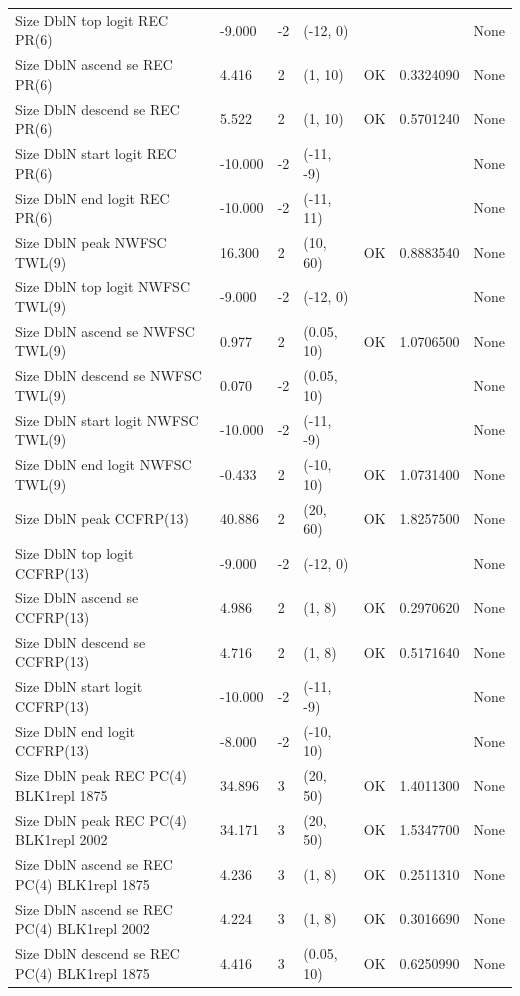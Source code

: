 \documentclass[11pt,
  english,
]{article}
\begin{document}
\begin{landscape}
\begin{longtable}[t]{lllllll}
\addlinespace
Size DblN top logit REC PR(6) & -9.000 & -2 & (-12, 0) &  &  & None\\
Size DblN ascend se REC PR(6) & 4.416 & 2 & (1, 10) & OK & 0.3324090 & None\\
Size DblN descend se REC PR(6) & 5.522 & 2 & (1, 10) & OK & 0.5701240 & None\\
Size DblN start logit REC PR(6) & -10.000 & -2 & (-11, -9) &  &  & None\\
Size DblN end logit REC PR(6) & -10.000 & -2 & (-11, 11) &  &  & None\\
\addlinespace
Size DblN peak NWFSC TWL(9) & 16.300 & 2 & (10, 60) & OK & 0.8883540 & None\\
Size DblN top logit NWFSC TWL(9) & -9.000 & -2 & (-12, 0) &  &  & None\\
Size DblN ascend se NWFSC TWL(9) & 0.977 & 2 & (0.05, 10) & OK & 1.0706500 & None\\
Size DblN descend se NWFSC TWL(9) & 0.070 & -2 & (0.05, 10) &  &  & None\\
Size DblN start logit NWFSC TWL(9) & -10.000 & -2 & (-11, -9) &  &  & None\\
\addlinespace
Size DblN end logit NWFSC TWL(9) & -0.433 & 2 & (-10, 10) & OK & 1.0731400 & None\\
Size DblN peak CCFRP(13) & 40.886 & 2 & (20, 60) & OK & 1.8257500 & None\\
Size DblN top logit CCFRP(13) & -9.000 & -2 & (-12, 0) &  &  & None\\
Size DblN ascend se CCFRP(13) & 4.986 & 2 & (1, 8) & OK & 0.2970620 & None\\
Size DblN descend se CCFRP(13) & 4.716 & 2 & (1, 8) & OK & 0.5171640 & None\\
\addlinespace
Size DblN start logit CCFRP(13) & -10.000 & -2 & (-11, -9) &  &  & None\\
Size DblN end logit CCFRP(13) & -8.000 & -2 & (-10, 10) &  &  & None\\
Size DblN peak REC PC(4) BLK1repl 1875 & 34.896 & 3 & (20, 50) & OK & 1.4011300 & None\\
Size DblN peak REC PC(4) BLK1repl 2002 & 34.171 & 3 & (20, 50) & OK & 1.5347700 & None\\
Size DblN ascend se REC PC(4) BLK1repl 1875 & 4.236 & 3 & (1, 8) & OK & 0.2511310 & None\\
\addlinespace
Size DblN ascend se REC PC(4) BLK1repl 2002 & 4.224 & 3 & (1, 8) & OK & 0.3016690 & None\\
Size DblN descend se REC PC(4) BLK1repl 1875 & 4.416 & 3 & (0.05, 10) & OK & 0.6250990 & None\\

\end{longtable}
\end{landscape}
\end{document}
